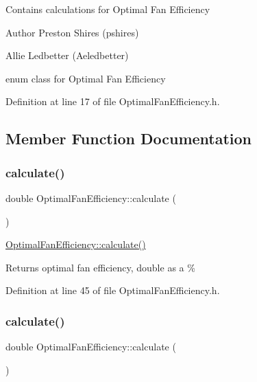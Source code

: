 Contains calculations for Optimal Fan Efficiency \begin{DoxyAuthor}{Author}
Preston Shires (pshires) 

Allie Ledbetter (Aeledbetter) 
\end{DoxyAuthor}
enum class for Optimal Fan Efficiency 

Definition at line 17 of file Optimal\+Fan\+Efficiency.\+h.



\subsection{Member Function Documentation}
\mbox{\label{class_optimal_fan_efficiency_ac35291d1095c74373393ac510e45ae02}} 
\subsubsection{\texorpdfstring{calculate()}{calculate()}\hspace{0.1cm}{\footnotesize\ttfamily [1/3]}}
{\footnotesize\ttfamily double Optimal\+Fan\+Efficiency\+::calculate (\begin{DoxyParamCaption}{ }\end{DoxyParamCaption})\hspace{0.3cm}{\ttfamily [inline]}}

\hyperlink{class_optimal_fan_efficiency_ac35291d1095c74373393ac510e45ae02}{Optimal\+Fan\+Efficiency\+::calculate()} \begin{DoxyReturn}{Returns}
optimal fan efficiency, double as a \% 
\end{DoxyReturn}


Definition at line 45 of file Optimal\+Fan\+Efficiency.\+h.

\mbox{\label{class_optimal_fan_efficiency_ac35291d1095c74373393ac510e45ae02}} 
\subsubsection{\texorpdfstring{calculate()}{calculate()}\hspace{0.1cm}{\footnotesize\ttfamily [2/3]}}
{\footnotesize\ttfamily double Optimal\+Fan\+Efficiency\+::calculate (\begin{DoxyParamCaption}{ }\end{DoxyParamCaption})\hspace{0.3cm}{\ttfamily [inline]}}

